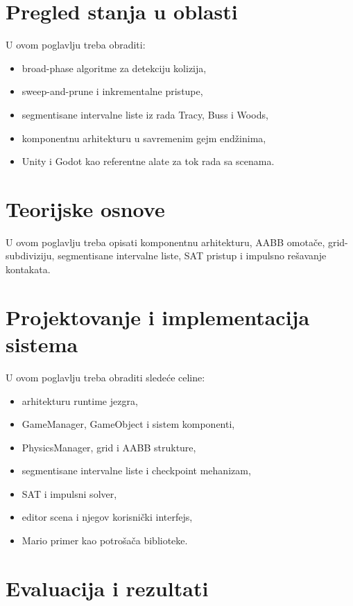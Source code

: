 \documentclass[12pt,a4paper]{report}
\begin{document}
\chapter{Pregled stanja u oblasti}

U ovom poglavlju treba obraditi:

\begin{itemize}
  \item broad-phase algoritme za detekciju kolizija,
  \item sweep-and-prune i inkrementalne pristupe,
  \item segmentisane intervalne liste iz rada Tracy, Buss i Woods,
  \item komponentnu arhitekturu u savremenim gejm endžinima,
  \item Unity i Godot kao referentne alate za tok rada sa scenama.
\end{itemize}

\chapter{Teorijske osnove}

U ovom poglavlju treba opisati komponentnu arhitekturu, AABB omotače, grid-subdiviziju, segmentisane intervalne liste, SAT pristup i impulsno rešavanje kontakata.

\chapter{Projektovanje i implementacija sistema}

U ovom poglavlju treba obraditi sledeće celine:

\begin{itemize}
  \item arhitekturu runtime jezgra,
  \item GameManager, GameObject i sistem komponenti,
  \item PhysicsManager, grid i AABB strukture,
  \item segmentisane intervalne liste i checkpoint mehanizam,
  \item SAT i impulsni solver,
  \item editor scena i njegov korisnički interfejs,
  \item Mario primer kao potrošača biblioteke.
\end{itemize}

\chapter{Evaluacija i rezultati}
\end{document}
